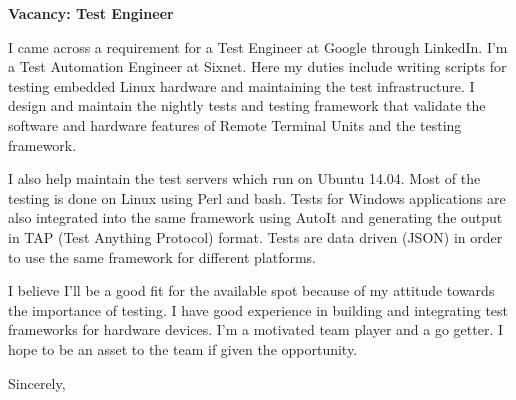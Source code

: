 \documentclass[12pt]{extletter}
\newcommand{\jobPosition}{Test Engineer}
\newcommand{\companyName}{Google}
\begin{document}
\begin{letter}{}

\opening{\textbf{Vacancy: {\jobPosition}}}
 
I came across a requirement for a {\jobPosition} at {\companyName} through
LinkedIn. I'm a Test Automation Engineer at Sixnet. Here my duties include
writing scripts for testing embedded Linux hardware and maintaining the test
infrastructure. I design and maintain the nightly tests and testing framework
that validate the software and hardware features of Remote Terminal Units and
the testing framework.

I also help maintain the test servers which run on Ubuntu 14.04. Most of the
testing is done on Linux using Perl and bash. Tests for Windows applications
are also integrated into the same framework using AutoIt and generating the
output in TAP (Test Anything Protocol) format. Tests are data driven (JSON)
in order to use the same framework for different platforms.

I believe I'll be a good fit for the available spot because of my attitude
towards the importance of testing. I have good experience in building and
integrating test frameworks for hardware devices. I'm a motivated team player
and a go getter. I hope to be an asset to the team if given the opportunity.

\vspace{2\parskip} %
\closing{Sincerely,}
\vspace{2\parskip} %

\end{letter}
 
\end{document}

